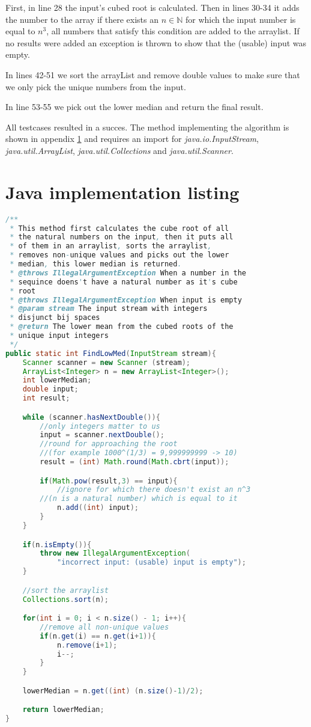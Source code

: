 \documentclass[12pt]{article}
\begin{document}
First, in line 28 the input's cubed root is calculated. Then in lines 30-34 it adds the number to the array if there exists an $n \in \mathbb{N}$ for which the input number is equal to $n^3$, all numbers that satisfy this condition are added to the arraylist. If no results were added an exception is thrown to show that the (usable) input was empty.

In lines 42-51 we sort the arrayList and remove double values to make sure that we only pick the unique numbers from the input.

In line 53-55 we pick out the lower median and return the final result.

All testcases resulted in a succes. The method implementing the algorithm is shown in appendix \ref{codelisting} and requires an import for \textsl{java.io.InputStream}, \textsl{java.util.ArrayList}, \textsl{java.util.Collections} and \textsl{java.util.Scanner}.

\appendix

\section{Java implementation listing}
\label{codelisting}
\begin{lstlisting}[language=java,basicstyle=\small]
/**
 * This method first calculates the cube root of all
 * the natural numbers on the input, then it puts all
 * of them in an arraylist, sorts the arraylist,
 * removes non-unique values and picks out the lower
 * median, this lower median is returned.
 * @throws IllegalArgumentException When a number in the
 * sequince doens't have a natural number as it's cube
 * root
 * @throws IllegalArgumentException When input is empty
 * @param stream The input stream with integers
 * disjunct bij spaces
 * @return The lower mean from the cubed roots of the
 * unique input integers
 */
public static int FindLowMed(InputStream stream){
    Scanner scanner = new Scanner (stream);
    ArrayList<Integer> n = new ArrayList<Integer>();
    int lowerMedian;
    double input;
    int result;

    while (scanner.hasNextDouble()){
        //only integers matter to us
        input = scanner.nextDouble();
        //round for approaching the root
        //(for example 1000^(1/3) = 9,999999999 -> 10)
        result = (int) Math.round(Math.cbrt(input));

        if(Math.pow(result,3) == input){
            //ignore for which there doesn't exist an n^3 
	    //(n is a natural number) which is equal to it
            n.add((int) input);
        }
    }

    if(n.isEmpty()){
        throw new IllegalArgumentException(
            "incorrect input: (usable) input is empty");
    }

    //sort the arraylist
    Collections.sort(n);

    for(int i = 0; i < n.size() - 1; i++){
        //remove all non-unique values
        if(n.get(i) == n.get(i+1)){
            n.remove(i+1);
            i--;
        }
    }

    lowerMedian = n.get((int) (n.size()-1)/2);

    return lowerMedian;
}
\end{lstlisting}
\end{document}
